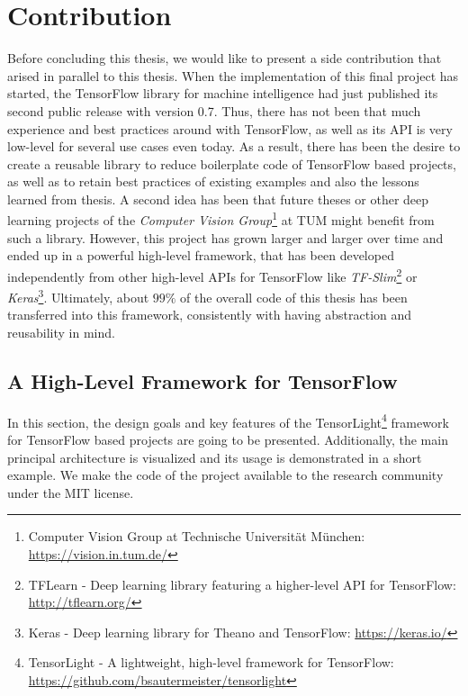 
\chapter{Contribution} \label{chapter:contribution}

Before concluding this thesis, we would like to present a side contribution that arised in parallel to this thesis. When the implementation of this final project has started, the TensorFlow library for machine intelligence had just published its second public release with version \num{0.7}. Thus, there has not been that much experience and best practices around with TensorFlow, as well as its API is very low-level for several use cases even today. As a result, there has been the desire to create a reusable library to reduce boilerplate code of TensorFlow based projects, as well as to retain best practices of existing examples and also the lessons learned from thesis. A second idea has been that future theses or other deep learning projects of the \textit{Computer Vision Group}\footnote{Computer Vision Group at Technische Universität München: \url{https://vision.in.tum.de/}} at TUM might benefit from such a library. However, this project has grown larger and larger over time and ended up in a powerful high-level framework, that has been developed independently from other high-level APIs for TensorFlow like \textit{TF-Slim}\footnote{TFLearn - Deep learning library featuring a higher-level API for TensorFlow: \url{http://tflearn.org/}} or \textit{Keras}\footnote{Keras - Deep learning library for Theano and TensorFlow: \url{https://keras.io/}}. Ultimately, about $ 99\% $ of the overall code of this thesis has been transferred into this framework, consistently with having abstraction and reusability in mind.

\section{A High-Level Framework for TensorFlow}

In this section, the design goals and key features of the TensorLight\footnote{TensorLight - A lightweight, high-level framework for TensorFlow:\\ \url{https://github.com/bsautermeister/tensorlight}} framework for TensorFlow based projects are going to be presented. Additionally, the main principal architecture is visualized and its usage is demonstrated in a short example. We make the code of the project available to the research community under the MIT license.

